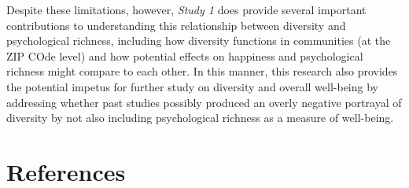 \documentclass[
  man,floatsintext]{apa7}
\begin{document}
Despite these limitations, however, \emph{Study 1} does provide several important contributions to understanding this relationship between diversity and psychological richness, including how diversity functions in communities (at the ZIP COde level) and how potential effects on happiness and psychological richness might compare to each other. In this manner, this research also provides the potential impetus for further study on diversity and overall well-being by addressing whether past studies possibly produced an overly negative portrayal of diversity by not also including psychological richness as a measure of well-being.

\newpage

\hypertarget{references}{%
\section{References}\label{references}}
\end{document}
